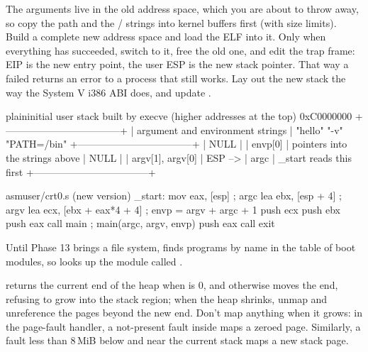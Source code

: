 \documentclass[11pt,a4paper]{article}
\begin{document}
The arguments live in the old address space, which you are about to throw away, so copy the path and the
/ strings into kernel buffers first (with size limits). Build a complete new address space and
load the ELF into it. Only when everything has succeeded, switch to it, free the old one, and edit the trap frame:
EIP is the new entry point, the user ESP is the new stack pointer. That way a failed  returns an error to a
process that still works. Lay out the new stack the way the System V i386 ABI does, and update .

\begin{lst}{plain}{initial user stack built by execve (higher addresses at the top)}
0xC0000000  +-----------------------------------+
            | argument and environment strings  |  "hello\0" "-v\0" "PATH=/bin\0"
            +-----------------------------------+
            | NULL                              |
            | envp[0]                           |  pointers into the strings above
            | NULL                              |
            | argv[1], argv[0]                  |
ESP  -->    | argc                              |  _start reads this first
            +-----------------------------------+
\end{lst}

\begin{lst}{asm}{user/crt0.s (new version)}
_start:
    mov  eax, [esp]             ; argc
    lea  ebx, [esp + 4]         ; argv
    lea  ecx, [ebx + eax*4 + 4] ; envp = argv + argc + 1
    push ecx
    push ebx
    push eax
    call main                   ; main(argc, argv, envp)
    push eax
    call exit
\end{lst}
Until Phase 13 brings a file system,  finds programs by name in the table of boot modules, so
 looks up the module called .

 returns the current end of the heap when  is 0, and otherwise moves the end, refusing
to grow into the stack region; when the heap shrinks, unmap and unreference the pages beyond the new end. Don't map
anything when it grows: in the page-fault handler, a not-present fault inside \code{[heap_start, brk)} maps a zeroed
page. Similarly, a fault less than 8\,MiB below  and near the current stack maps a new stack page.
\end{document}

